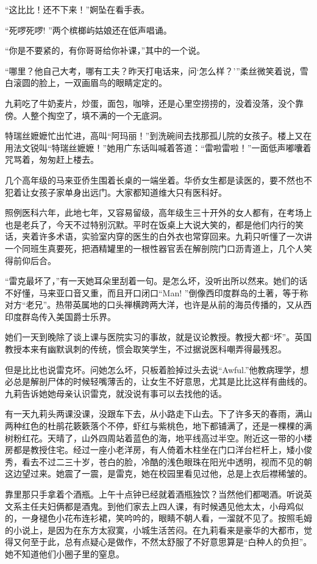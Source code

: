 \par “这比比！还不下来！”婀坠在看手表。
\par “死啰死啰! ”两个槟榔屿姑娘还在低声唱诵。
\par “你是不要紧的，有你哥哥给你补课，”其中的一个说。
\par “哪里？他自己大考，哪有工夫？昨天打电话来，问‘怎么样？'”柔丝微笑着说，雪白滚圆的脸上，一双画眉鸟的眼睛定定的。
\par 九莉吃了牛奶麦片，炒蛋，面包，咖啡，还是心里空捞捞的，没着没落，没个靠傍。人整个掏空了，填不满的一个无底洞。
\par 特瑞丝嬷嬷忙出忙进，高叫“阿玛丽！”到洗碗间去找那孤儿院的女孩子。楼上又在用法文锐叫“特瑞丝嬷嬷！”她用广东话叫喊着答道：“雷啦雷啦！”一面低声嘟囔着咒骂着，匆匆赶上楼去。
\par 几个高年级的马来亚侨生围着长桌的一端坐着。华侨女生都是读医的，要不然也不犯着让女孩子家单身出远门。大家都知道维大只有医科好。
\par 照例医科六年，此地七年，又容易留级，高年级生三十开外的女人都有，在考场上也是老兵了，今天不过特别沉默。平时在饭桌上大说大笑的，都是他们内行的笑话，夹着许多术语，实验室内穿的医生的白外衣也常穿回来。九莉只听懂了一次讲一个同班生真要死，把酒精罐里的一根性器官丢在解剖院门口沥青道上，几个人笑得前仰后合。
\par “雷克最坏了，”有一天她耳朵里刮着一句。是怎么坏，没听出所以然来。她们的话不好懂，马来亚口音又重，而且开口闭口“Man! ”倒像西印度群岛的土著，等于称对方“老兄”。热带英属地的口头禅横跨两大洋，也许是从前的海员传播的，又从西印度群岛传入美国爵士乐界。
\par 她们一天到晚除了谈上课与医院实习的事故，就是议论教授。教授大都“坏”。英国教授本来有幽默讽刺的传统，惯会取笑学生，不过据说医科嘲弄得最残忍。
\par 但是比比也说雷克坏。问她怎么坏，只板着脸掉过头去说“Awful.”他教病理学，想必总是解剖尸体的时候轻嘴薄舌的，让女生不好意思，尤其是比比这样有曲线的。九莉告诉她她母亲认识雷克，就没说有事可以去找他的话。
\par 有一天九莉头两课没课，没跟车下去，从小路走下山去。下了许多天的春雨，满山两种红色的杜鹃花簌簌落个不停，虾红与紫桃色，地下都铺满了，还是一棵棵的满树粉红花。天晴了，山外四周站着蓝色的海，地平线高过半空。附近这一带的小楼房都是教授住宅。经过一座小老洋房，有人倚着木柱坐在门口洋台栏杆上，矮小俊秀，看去不过二三十岁，苍白的脸，冷酷的浅色眼珠在阳光中透明，视而不见的朝这边望过来。她震了一震，是雷克，她在校园里看见过他，总是上衣后襟稀皱的。
\par 靠里那只手拿着个酒瓶。上午十点钟已经就着酒瓶独饮？当然他们都喝酒。听说英文系主任夫妇俩都是酒鬼。到他们家去上四人课，有时候遇见他太太，小母鸡似的，一身褪色小花布连衫裙，笑吟吟的，眼睛不朝人看，一溜就不见了。按照毛姆的小说上，是因为在东方太寂寞，小城生活苦闷。在九莉看来是豪华的大都市，觉得又何至于此，总有点疑心是做作，不然太舒服了不好意思算是“白种人的负担”。她不知道他们小圈子里的窒息。

